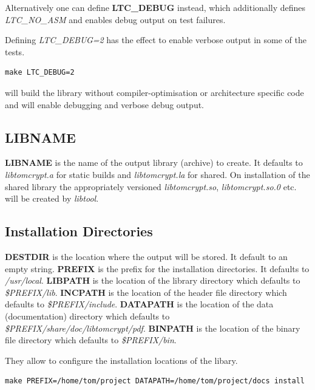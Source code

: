 \documentclass[synpaper]{book}
\begin{document}
Alternatively one can define \textbf{LTC\_DEBUG} instead, which additionally defines \textit{LTC\_NO\_ASM} and enables debug output on test failures.

Defining \textit{LTC\_DEBUG=2} has the effect to enable verbose output in some of the tests.

\begin{verbatim}
make LTC_DEBUG=2
\end{verbatim}

\begin{flushleft} will build the library without compiler-optimisation or architecture specific code and will enable debugging
and verbose debug output. \end{flushleft}

\subsection{LIBNAME}
\textbf{LIBNAME} is the name of the output library (archive) to create.  It defaults to \textit{libtomcrypt.a} for static builds and \textit{libtomcrypt.la} for
shared.
On installation of the shared library the appropriately versioned \textit{libtomcrypt.so}, \textit{libtomcrypt.so.0} etc. will be created by \textit{libtool}.

\subsection{Installation Directories}
     
\textbf{DESTDIR} is the location where the output will be stored.  It default to an empty string.
\textbf{PREFIX} is the prefix for the installation directories.  It defaults to \textit{/usr/local}.
\textbf{LIBPATH} is the location of the library directory which defaults to \textit{\$PREFIX/lib}.
\textbf{INCPATH} is the location of the header file directory which defaults to \textit{\$PREFIX/include}.
\textbf{DATAPATH} is the location of the data (documentation) directory which defaults to \textit{\$PREFIX/share/doc/libtomcrypt/pdf}.
\textbf{BINPATH} is the location of the binary file directory which defaults to \textit{\$PREFIX/bin}.

They allow to configure the installation locations of the libary.

\begin{verbatim}
make PREFIX=/home/tom/project DATAPATH=/home/tom/project/docs install
\end{verbatim}
\end{document}
